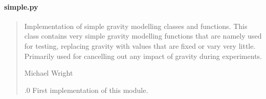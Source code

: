 \documentclass[letterpaper,10pt,english]{sphinxmanual}
\begin{document}
\paragraph{simple.py}
\label{\detokenize{modules/gravity/simple:simple-py}}\begin{quote}\begin{description}
\sphinxAtStartPar
Implementation of simple gravity modelling classes and functions.
This class contains very simple gravity modelling functions that are
namely used for testing, replacing gravity with values that are fixed
or vary very little. Primarily used for cancelling out any impact of
gravity during experiments.

\sphinxAtStartPar
Michael Wright \sphinxhyphen{} 

.0 \sphinxhyphen{} First implementation of this module.

\end{description}\end{quote}
\end{document}
